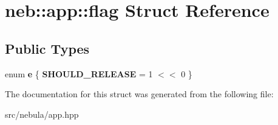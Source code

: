 \hypertarget{structneb_1_1app_1_1flag}{\section{neb\-:\-:app\-:\-:flag \-Struct \-Reference}
\label{structneb_1_1app_1_1flag}
}
\subsection*{\-Public \-Types}
\begin{DoxyCompactItemize}
\item 
enum {\bfseries e} \{ {\bfseries \-S\-H\-O\-U\-L\-D\-\_\-\-R\-E\-L\-E\-A\-S\-E} =  1 $<$$<$ 0
 \}
\end{DoxyCompactItemize}


\-The documentation for this struct was generated from the following file\-:\begin{DoxyCompactItemize}
\item 
src/nebula/app.\-hpp\end{DoxyCompactItemize}
